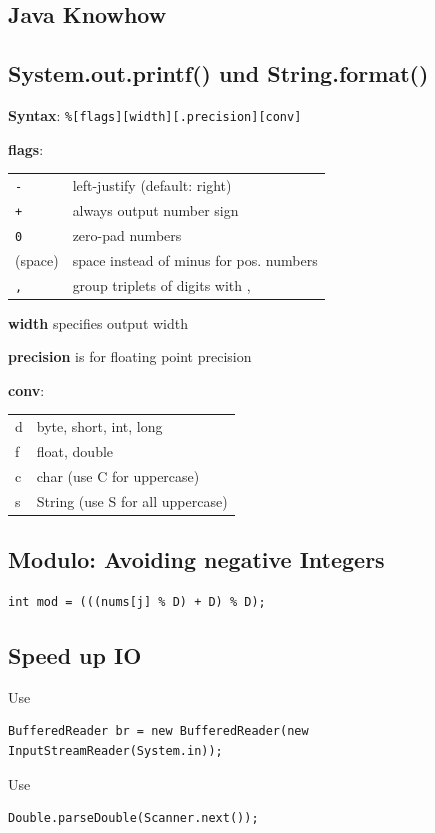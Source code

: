 \documentclass[10pt,a4paper,ngerman,oneside,]{article}
\begin{document}
\begin{multicols}{2}
\section{Java Knowhow}
\subsection{System.out.printf() und String.format()}
\textbf{Syntax}: \texttt{\%[flags][width][.precision][conv]}

\textbf{flags}: \\ \begin{tabular}{ll}
  \texttt{-} & left-justify (default: right) \\
  \texttt{+} & always output number sign \\
  \texttt{0} & zero-pad numbers \\
  (space)    & space instead of minus for pos. numbers \\
  \texttt{,} & group triplets of digits with ,
\end{tabular}

\textbf{width} specifies output width

\textbf{precision} is for floating point precision

\textbf{conv}: \\ \begin{tabular}{ll}
  d & byte, short, int, long \\
  f & float, double \\
  c & char (use C for uppercase) \\
  s & String (use S for all uppercase)
\end{tabular}

\subsection{Modulo: Avoiding negative Integers}
\begin{lstlisting}
int mod = (((nums[j] % D) + D) % D);
\end{lstlisting}

\subsection{Speed up IO}
Use
\begin{lstlisting}
BufferedReader br = new BufferedReader(new
InputStreamReader(System.in));
\end{lstlisting}
Use
\begin{lstlisting}
Double.parseDouble(Scanner.next());
\end{lstlisting}
\end{multicols}



\end{document}
